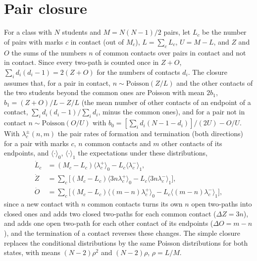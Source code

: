 \section{Pair closure}\label{app:closure}
For a class with $N$ students and $M = N(N-1)/2$ pairs, let $L_c$ be the number of pairs with marks $c$ in contact (out of $M_c$), $L = \sum_c L_c$, $U = M - L$, and $Z$ and $O$ the sums of the numbers $n$ of common contacts over pairs in contact and not in contact.
Since every two-path is counted once in $Z + O$, $\sum_i d_i (d_i - 1) = 2(Z + O)$ for the numbers of contacts $d_i$.
The closure assumes that, for a pair in contact, $n \sim \mathrm{Poisson}(Z/L)$ and the other contacts of the two students beyond the common ones are Poisson with mean $2 b_1$, $b_1 = (Z + O)/L - Z/L$ (the mean number of other contacts of an endpoint of a contact, $\sum_i d_i(d_i - 1)/\sum_i d_i$, minus the common ones), and for a pair not in contact $n \sim \mathrm{Poisson}(O/U)$ with $b_0 = [\sum_i d_i (N - 1 - d_i)]/(2U) - O/U$.
With $\lambda^{\pm}_c(n, m)$ the pair rates of formation and termination (both directions) for a pair with marks $c$, $n$ common contacts and $m$ other contacts of its endpoints, and $\langle \cdot \rangle_0$, $\langle \cdot \rangle_1$ the expectations under these distributions,
\begin{equation*}
\begin{aligned}
  \dot L_c &= (M_c - L_c) \langle \lambda^+_c \rangle_0 - L_c \langle \lambda^-_c \rangle_1, \\
  \dot Z &= \textstyle\sum_c \bigl[(M_c - L_c) \langle 3 n \lambda^+_c \rangle_0 - L_c \langle 3 n \lambda^-_c \rangle_1\bigr], \\
  \dot O &= \textstyle\sum_c \bigl[(M_c - L_c) \langle (m - n) \lambda^+_c \rangle_0 - L_c \langle (m - n) \lambda^-_c \rangle_1\bigr],
\end{aligned}
\end{equation*}
since a new contact with $n$ common contacts turns its own $n$ open two-paths into closed ones and adds two closed two-paths for each common contact ($\Delta Z = 3n$), and adds one open two-path for each other contact of its endpoints ($\Delta O = m - n$), and the termination of a contact reverses these changes.
The simple closure replaces the conditional distributions by the same Poisson distributions for both states, with means $(N - 2)\rho^2$ and $(N - 2)\rho$, $\rho = L/M$.
